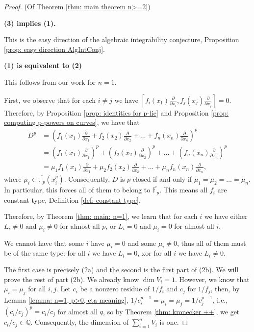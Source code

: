 \documentclass{amsart}
\newcommand{\op}{\operatorname}
\theoremstyle{definition}
\begin{document}
\begin{proof} (Of Theorem \ref{thm: main theorem n>=2})

    \textbf{(3) implies (1).}

    This is the easy direction of the algebraic integrability conjecture, Proposition \ref{prop: easy direction AlgIntConj}.

    \textbf{(1) is equivalent to (2)}
    
    This follows from our work for $n=1$. 
    
    First, we observe that for each $i\ne j$ we have $[f_i(x_1)\frac{\partial}{\partial x_i},f_j(x_j)\frac{\partial}{\partial x_j}]=0$. Therefore, by Proposition \ref{prop: identities for p-lie} and Proposition \ref{prop: computing p-powers on curves}, we have that
    \begin{align*}
    D^p&=\left(f_1(x_1)\frac{\partial}{\partial x_1}+f_2(x_2)\frac{\partial}{\partial x_2}+\ldots+f_n(x_n)\frac{\partial}{\partial x_n}\right)^p  \\
    &=\left(f_1(x_1)\frac{\partial}{\partial x_1}\right)^p+\left(f_2(x_2)\frac{\partial}{\partial x_2}\right)^p+\ldots+\left(f_n(x_n)\frac{\partial}{\partial x_n}\right)^p\\
    &=\mu_1f_1(x_1)\frac{\partial}{\partial x_1}+\mu_2f_2(x_2)\frac{\partial}{\partial x_2}+\ldots+\mu_nf_n(x_n)\frac{\partial}{\partial x_n},
    \end{align*}
    where $\mu_i\in \overline{\mathbb{F}_p}(x_i^p)$. Consequently, $D$ is $p$-closed if and only if $\mu_1=\mu_2=\ldots=\mu_n$. In particular, this forces all of them to belong to $\overline{\mathbb{F}_p}$. This means all $f_i$ are constant-type, Definition \ref{def: constant-type}.

    Therefore, by Theorem \ref{thm: main: n=1}, we learn that for each $i$ we have either $L_i\ne 0$ and $\mu_i\ne 0$ for almost all $p$, or $L_i=0$ and $\mu_i=0$ for almost all $i$.

    We cannot have that some $i$ have $\mu_i=0$ and some $\mu_i\ne 0$, thus all of them must be of the same type: 
    for all $i$ we have $L_i=0$, xor for all $i$ we have $L_i\ne 0$.

    The first case is precisely (2a) and the second is the first part of (2b). We will prove the rest of part (2b). We already know $\op{dim}V_i=1$. However, we know that $\mu_i=\mu_j$ for all $i,j$. Let $c_i$ be a nonzero residue of $1/f_i$ and $c_j$ for $1/f_j$, then, by Lemma \ref{lemma: n=1, p>0, eta meaning}, $1/c_i^{p-1}=\mu_i=\mu_j=1/c_j^{p-1}$, i.e., $\left(c_i/c_j\right)^{p}=c_i/c_j$ for almost all $q$, so by Theorem \ref{thm: kronecker ++}, we get $c_i/c_j\in \mathbb{Q}$. Consequently, the dimension of $\sum_{i=1}^n V_i$ is one.


\end{proof}
\end{document}
